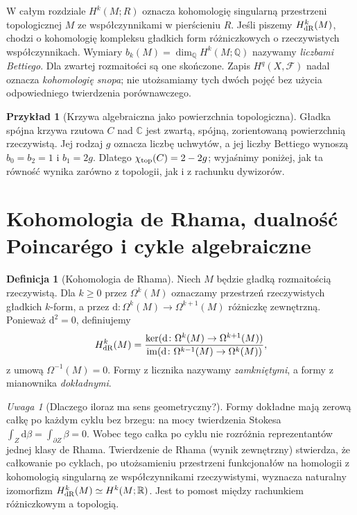 \documentclass[11pt,a4paper,openany]{report}
\numberwithin{equation}{section}
\theoremstyle{plain}
\theoremstyle{definition}
\newtheorem{definicja}[twierdzenie]{Definicja}
\newtheorem{przyklad}[twierdzenie]{Przykład}
\theoremstyle{remark}
\newtheorem{uwaga}[twierdzenie]{Uwaga}
\newcommand{\Q}{\mathbb Q}
\newcommand{\R}{\mathbb R}
\newcommand{\C}{\mathbb C}
\begin{document}
W całym rozdziale $H^k(M;R)$ oznacza kohomologię singularną
przestrzeni topologicznej $M$ ze współczynnikami w pierścieniu $R$.
Jeśli piszemy $H^k_{\rm dR}(M)$, chodzi o kohomologię kompleksu
gładkich form różniczkowych o rzeczywistych współczynnikach.
Wymiary $b_k(M)=\dim_{\Q}H^k(M;\Q)$ nazywamy \emph{liczbami Bettiego}.
Dla zwartej rozmaitości są one skończone. Zapis $H^q(X,\mathcal F)$
nadal oznacza \emph{kohomologię snopa}; nie utożsamiamy tych dwóch
pojęć bez użycia odpowiedniego twierdzenia porównawczego.

\begin{przyklad}[Krzywa algebraiczna jako powierzchnia topologiczna]
Gładka spójna krzywa rzutowa $C$ nad $\C$ jest zwartą, spójną,
zorientowaną powierzchnią rzeczywistą. Jej rodzaj $g$ oznacza liczbę
uchwytów, a jej liczby Bettiego wynoszą $b_0=b_2=1$ i $b_1=2g$.
Dlatego $\chi_{\rm top}(C)=2-2g$; wyjaśnimy poniżej, jak ta
równość wynika zarówno z topologii, jak i z rachunku dywizorów.
\end{przyklad}

\section{Kohomologia de Rhama, dualność Poincarégo i cykle algebraiczne}
\label{sec:ga10-de-rham}

\begin{definicja}[Kohomologia de Rhama]
Niech $M$ będzie gładką rozmaitością rzeczywistą.
Dla $k\ge0$ przez $\Omega^k(M)$ oznaczamy przestrzeń
rzeczywistych gładkich $k$-form, a przez $\mathrm d\colon\Omega^k(M)
\to\Omega^{k+1}(M)$ różniczkę zewnętrzną. Ponieważ $\mathrm d^2=0$,
definiujemy
\[
 H^k_{\rm dR}(M)=\frac{\ker(\mathrm d\colon\Omega^k(M)\to
 \Omega^{k+1}(M))}{\operatorname{im}(\mathrm d\colon
 \Omega^{k-1}(M)\to\Omega^k(M))},
\]
z umową $\Omega^{-1}(M)=0$. Formy z licznika nazywamy
\emph{zamkniętymi}, a formy z mianownika \emph{dokładnymi}.
\end{definicja}

\begin{uwaga}[Dlaczego iloraz ma sens geometryczny?]
Formy dokładne mają zerową całkę po każdym cyklu bez brzegu:
na mocy twierdzenia Stokesa $\int_Z\mathrm d\beta
=\int_{\partial Z}\beta=0$. Wobec tego całka po cyklu
nie rozróżnia reprezentantów jednej klasy de Rhama.
Twierdzenie de Rhama (wynik zewnętrzny) stwierdza,
że całkowanie po cyklach, po utożsamieniu przestrzeni
funkcjonałów na homologii z kohomologią singularną
ze współczynnikami rzeczywistymi, wyznacza naturalny
izomorfizm $H^k_{\rm dR}(M)\simeq H^k(M;\R)$.
Jest to pomost między rachunkiem różniczkowym a topologią.
\end{uwaga}
\end{document}
